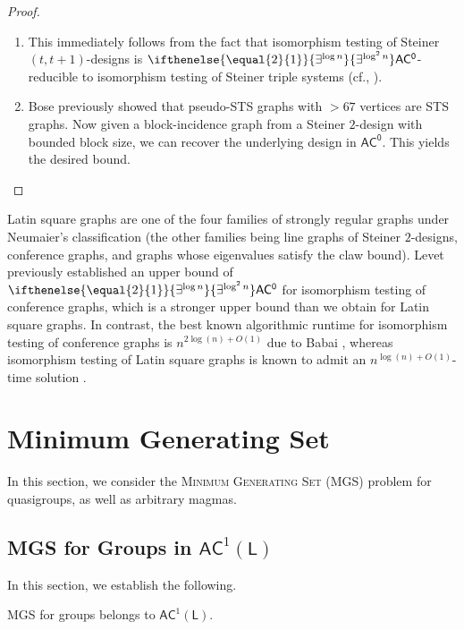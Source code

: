 \documentclass{theoretics}
\newcommand{\algprobm}[1]{\textsc{#1}\xspace}
\newcommand{\betacc}[1]{\ifthenelse{\equal{#1}{1}}{\exists^{\log n}}{\exists^{\log^{#1}n}}} %
\newcommand*{\ComplexityClass}[1]{\ensuremath{\mathsf{#1}}\xspace}
\newcommand*{\LogSpace}{\ComplexityClass{L}}
\newcommand{\AC}{\ComplexityClass{AC}}
\newcommand{\ACz}{\ComplexityClass{AC^0}}
\begin{document}
\begin{proof}
\begin{enumerate}[label=(\alph*)]
\item This immediately follows from the fact that  isomorphism testing of Steiner $(t,t+1)$-designs is $\betacc{2}\ACz$-reducible to isomorphism testing of Steiner triple systems \cite{BabaiWilmes} (cf., \cite[Corollary~4.11]{LevetLatinSquares}).

\item Bose \cite{Bose} previously showed that pseudo-STS graphs with $> 67$ vertices are STS graphs. Now given a block-incidence graph from a Steiner $2$-design with bounded block size, we can recover the underlying design in \ACz \cite[Proposition~4.7]{LevetLatinSquares}. This yields the desired bound.\qedhere
\end{enumerate}
\end{proof}

\begin{remark} \label{rmk:LatinSquares}
 Latin square graphs are one of the four families of strongly regular graphs under Neumaier's classification \cite{Neumaier} (the other families being line graphs of Steiner $2$-designs, conference graphs, and graphs whose eigenvalues satisfy the claw bound). Levet \cite{LevetLatinSquares} previously established an upper bound of $\betacc{2}\ACz$ for isomorphism testing of conference graphs, which is a stronger upper bound than we obtain for Latin square graphs. In contrast, the best known algorithmic runtime for isomorphism testing of conference graphs is $n^{2\log(n) + O(1)}$ due to Babai \cite{BabaiCanonicalLabeling1}, whereas isomorphism testing of Latin square graphs is known to admit an $n^{\log(n) + O(1)}$-time solution \cite{MillerTarjan}.
\end{remark}


\section{Minimum Generating Set}

In this section, we consider the \algprobm{Minimum Generating Set} (\algprobm{MGS}) problem for quasigroups, as well as arbitrary magmas.

\subsection{MGS for Groups in \texorpdfstring{$\AC^1(\LogSpace)$}{AC1(LogSpace)}}

In this section, we establish the following.

\begin{theorem} \label{thm:MGSSAC2}
\algprobm{MGS} for groups belongs to $\AC^{1}(\LogSpace)$.
\end{theorem}
\end{document}
